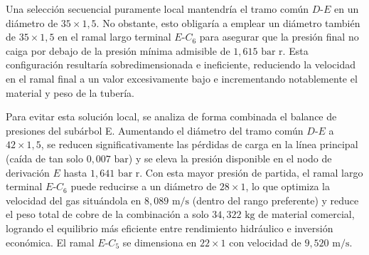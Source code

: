 \documentclass[12pt]{article}
\begin{document}
        Una selección secuencial puramente local mantendría el tramo común $D$-$E$ en un diámetro de $35 \times 1,5$. No obstante, esto obligaría a emplear un diámetro también de $35 \times 1,5$ en el ramal largo terminal $E$-$C_6$ para asegurar que la presión final no caiga por debajo de la presión mínima admisible de $1,615\text{ bar r}$. Esta configuración resultaría sobredimensionada e ineficiente, reduciendo la velocidad en el ramal final a un valor excesivamente bajo e incrementando notablemente el material y peso de la tubería.
        
        Para evitar esta solución local, se analiza de forma combinada el balance de presiones del subárbol E. Aumentando el diámetro del tramo común $D$-$E$ a $42 \times 1,5$, se reducen significativamente las pérdidas de carga en la línea principal (caída de tan solo $0,007\text{ bar}$) y se eleva la presión disponible en el nodo de derivación $E$ hasta $1,641\text{ bar r}$. Con esta mayor presión de partida, el ramal largo terminal $E$-$C_6$ puede reducirse a un diámetro de $28 \times 1$, lo que optimiza la velocidad del gas situándola en $8,089\text{ m/s}$ (dentro del rango preferente) y reduce el peso total de cobre de la combinación a solo $34,322\text{ kg}$ de material comercial, logrando el equilibrio más eficiente entre rendimiento hidráulico e inversión económica. El ramal $E$-$C_5$ se dimensiona en $22 \times 1$ con velocidad de $9,520\text{ m/s}$.
\end{document}
